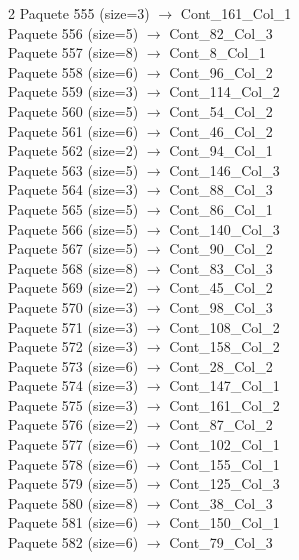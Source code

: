 \begin{multicols}{2}
Paquete 555 (size=3) $\rightarrow$ Cont\_161\_Col\_1\\
Paquete 556 (size=5) $\rightarrow$ Cont\_82\_Col\_3\\
Paquete 557 (size=8) $\rightarrow$ Cont\_8\_Col\_1\\
Paquete 558 (size=6) $\rightarrow$ Cont\_96\_Col\_2\\
Paquete 559 (size=3) $\rightarrow$ Cont\_114\_Col\_2\\
Paquete 560 (size=5) $\rightarrow$ Cont\_54\_Col\_2\\
Paquete 561 (size=6) $\rightarrow$ Cont\_46\_Col\_2\\
Paquete 562 (size=2) $\rightarrow$ Cont\_94\_Col\_1\\
Paquete 563 (size=5) $\rightarrow$ Cont\_146\_Col\_3\\
Paquete 564 (size=3) $\rightarrow$ Cont\_88\_Col\_3\\
Paquete 565 (size=5) $\rightarrow$ Cont\_86\_Col\_1\\
Paquete 566 (size=5) $\rightarrow$ Cont\_140\_Col\_3\\
Paquete 567 (size=5) $\rightarrow$ Cont\_90\_Col\_2\\
Paquete 568 (size=8) $\rightarrow$ Cont\_83\_Col\_3\\
Paquete 569 (size=2) $\rightarrow$ Cont\_45\_Col\_2\\
Paquete 570 (size=3) $\rightarrow$ Cont\_98\_Col\_3\\
Paquete 571 (size=3) $\rightarrow$ Cont\_108\_Col\_2\\
Paquete 572 (size=3) $\rightarrow$ Cont\_158\_Col\_2\\
Paquete 573 (size=6) $\rightarrow$ Cont\_28\_Col\_2\\
Paquete 574 (size=3) $\rightarrow$ Cont\_147\_Col\_1\\
Paquete 575 (size=3) $\rightarrow$ Cont\_161\_Col\_2\\
Paquete 576 (size=2) $\rightarrow$ Cont\_87\_Col\_2\\
Paquete 577 (size=6) $\rightarrow$ Cont\_102\_Col\_1\\
Paquete 578 (size=6) $\rightarrow$ Cont\_155\_Col\_1\\
Paquete 579 (size=5) $\rightarrow$ Cont\_125\_Col\_3\\
Paquete 580 (size=8) $\rightarrow$ Cont\_38\_Col\_3\\
Paquete 581 (size=6) $\rightarrow$ Cont\_150\_Col\_1\\
Paquete 582 (size=6) $\rightarrow$ Cont\_79\_Col\_3\\

\end{multicols}
